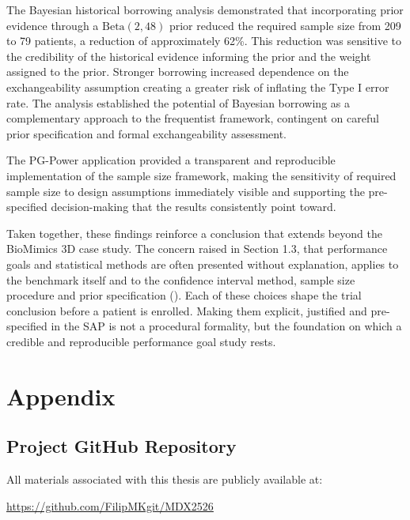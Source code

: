 \documentclass{article}
\begin{document}
The Bayesian historical borrowing analysis demonstrated that
incorporating prior evidence through a \(\text{Beta}(2, 48)\) prior
reduced the required sample size from 209 to 79 patients, a reduction of
approximately 62\%. This reduction was sensitive to the credibility of
the historical evidence informing the prior and the weight assigned to
the prior. Stronger borrowing increased dependence on the
exchangeability assumption creating a greater risk of inflating the Type
I error rate. The analysis established the potential of Bayesian
borrowing as a complementary approach to the frequentist framework,
contingent on careful prior specification and formal exchangeability
assessment.

The PG-Power application provided a transparent and reproducible
implementation of the sample size framework, making the sensitivity of
required sample size to design assumptions immediately visible and
supporting the pre-specified decision-making that the results
consistently point toward.

Taken together, these findings reinforce a conclusion that extends
beyond the BioMimics 3D case study. The concern raised in Section 1.3,
that performance goals and statistical methods are often presented
without explanation, applies to the benchmark itself and to the
confidence interval method, sample size procedure and prior
specification (). Each of these
choices shape the trial conclusion before a patient is enrolled. Making
them explicit, justified and pre-specified in the SAP is not a
procedural formality, but the foundation on which a credible and
reproducible performance goal study rests.

\newpage

\section*{Appendix}\label{appendix}

\subsection*{Project GitHub Repository}\label{project-github-repository}

All materials associated with this thesis are publicly available at:

\url{https://github.com/FilipMKgit/MDX2526}
\end{document}
